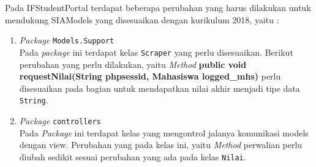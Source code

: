 Pada IFStudentPortal terdapat beberapa perubahan yang harus dilakukan untuk mendukung SIAModels yang disesuaikan dengan kurikulum 2018, yaitu :
\begin{enumerate}
	\item \textit{Package} \texttt{Models.Support} \\
	Pada \textit{package} ini terdapat kelas \texttt{Scraper} yang perlu disesuaikan. Berikut perubahan yang perlu dilakukan, yaitu \textit{Method} \textbf{public void requestNilai(String phpsessid, Mahasiswa logged\_mhs)} perlu disesuaikan pada bagian untuk mendapatkan nilai akhir menjadi tipe data \texttt{String}.
	\item \textit{Package} \texttt{controllers} \\
	Pada \textit{Package} ini terdapat kelas yang mengontrol jalanya komunikasi models dengan view. Perubahan yang pada kelas ini, yaitu \textit{Method} perwalian perlu diubah sedikit sesuai perubahan yang ada pada kelas \texttt{Nilai}.
\end{enumerate}

